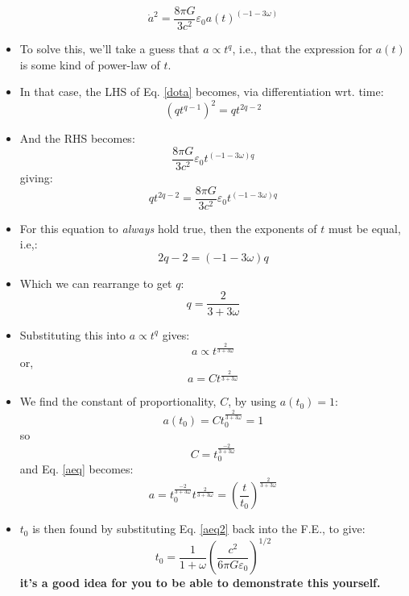 \documentclass[11pt]{article}
\newcommand{\vep}[1]{\ensuremath{\varepsilon#1}}
\begin{document}
\begin{itemize}
\begin{equation}
\label{dota}
    \dot{a}^2 = \frac{8\pi G}{3c^2}\vep{_0}a(t)^{(-1-3\omega)}
\end{equation}
\item To solve this, we'll take a guess that $a\propto t^q$, i.e., that the expression for $a(t)$ is some kind of power-law of $t$.
\item In that case, the LHS of Eq. \ref{dota} becomes, via differentiation wrt. time:
\begin{equation}
(qt^{q-1})^2 = qt^{2q-2}
\end{equation}
\item And the RHS becomes:
\begin{equation}
\frac{8\pi G}{3c^2}\vep{_0}t^{(-1-3\omega)q}  
\end{equation}
giving:
\begin{equation}
    qt^{2q-2} = \frac{8\pi G}{3c^2}\vep{_0}t^{(-1-3\omega)q}  
\end{equation}
\item For this equation to {\it always} hold true, then the exponents of $t$ must be equal, i.e,:
\begin{equation}
    2q-2 = (-1-3\omega)q  
\end{equation}
\item Which we can rearrange to get $q$:
\begin{equation}
    q = \frac{2}{3+3\omega}  
\end{equation}
\item Substituting this into $a\propto t^q$ gives:
\begin{equation}
    a \propto t^{\frac{2}{3+3\omega}}  
\end{equation}
or,
\begin{equation}
    \label{aeq}
    a = Ct^{\frac{2}{3+3\omega}}  
\end{equation}
\item We find the constant of proportionality, $C$, by using $a(t_0) = 1$:
\begin{equation}
    a(t_0) = Ct_0^{\frac{2}{3+3\omega}} = 1  
\end{equation}
so 
\begin{equation}
    C = t_0^{\frac{-2}{3+3\omega}}  
\end{equation}
and Eq. \ref{aeq} becomes:
\begin{equation}
    \label{aeq2}
    a = t_0^{\frac{-2}{3+3\omega}}t^{\frac{2}{3+3\omega}} = \left(\frac{t}{t_0}\right)^{\frac{2}{3+3\omega}}
\end{equation}
\item $t_0$ is then found by substituting Eq. \ref{aeq2} back into the F.E., to give:
\begin{equation}
\label{t0}
    t_0 = \frac{1}{1+\omega}\left(\frac{c^2}{6\pi G\vep{_0}}\right)^{1/2}
\end{equation}
{\bf it's a good idea for you to be able to demonstrate this yourself.}
\end{itemize}
\end{document}
